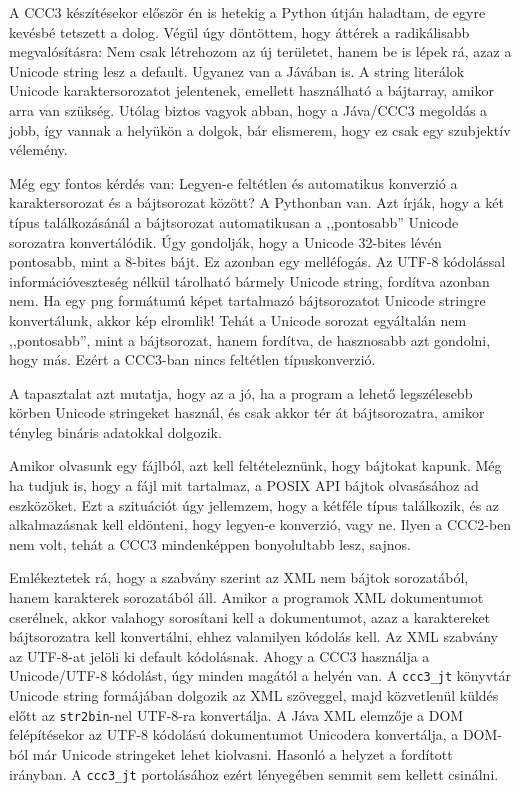A CCC3 készítésekor először én is hetekig a Python útján haladtam,
de egyre kevésbé tetszett a dolog. Végül úgy döntöttem,
hogy áttérek a radikálisabb megvalósításra: Nem csak létrehozom
az új területet, hanem be is lépek rá, azaz a Unicode string
lesz a default. Ugyanez van a Jávában is. A string literálok
Unicode karaktersorozatot jelentenek, emellett használható a
bájtarray, amikor arra van szükség. Utólag biztos vagyok
abban, hogy a Jáva/CCC3 megoldás a jobb, így vannak a helyükön
a dolgok, bár elismerem, hogy ez csak egy szubjektív vélemény.

Még egy fontos kérdés van: Legyen-e feltétlen és automatikus
konverzió a karaktersorozat és a bájtsorozat között?
A Pythonban van. Azt írják, hogy a két típus találkozásánál
a bájtsorozat automatikusan a ,,pontosabb'' Unicode sorozatra
konvertálódik. Úgy gondolják, hogy a Unicode 32-bites lévén
pontosabb, mint a 8-bites bájt. Ez azonban egy melléfogás.
Az UTF-8 kódolással információveszteség nélkül tárolható
bármely Unicode string, fordítva azonban nem.
Ha egy png formátumú képet tartalmazó bájtsorozatot
Unicode stringre konvertálunk, akkor kép elromlik!
Tehát a Unicode sorozat egyáltalán nem ,,pontosabb'', 
mint a bájtsorozat, hanem fordítva, de hasznosabb azt gondolni, 
hogy más. Ezért a CCC3-ban nincs feltétlen típuskonverzió.

A tapasztalat azt mutatja, hogy az a jó, ha a program 
a lehető legszélesebb körben Unicode stringeket használ,
és csak akkor tér át bájtsorozatra, amikor tényleg
bináris adatokkal dolgozik. 

Amikor olvasunk egy fájlból, azt kell feltételeznünk, hogy
bájtokat kapunk. Még ha tudjuk is, hogy a fájl mit tartalmaz,
a POSIX API bájtok olvasásához ad eszközöket. 
Ezt a szituációt úgy jellemzem, hogy a kétféle típus találkozik,
és az alkalmazásnak kell eldönteni, hogy legyen-e konverzió,
vagy ne. Ilyen a CCC2-ben nem volt, tehát a CCC3 mindenképpen
bonyolultabb lesz, sajnos.

Emlékeztetek rá, hogy a szabvány szerint az XML nem bájtok
sorozatából, hanem karakterek sorozatából áll. Amikor a programok
XML dokumentumot cserélnek, akkor valahogy sorosítani kell
a dokumentumot, azaz a karaktereket bájtsorozatra kell
konvertálni, ehhez valamilyen kódolás kell. Az XML szabvány 
az UTF-8-at jelöli ki default kódolásnak. Ahogy a CCC3 használja 
a Unicode/UTF-8 kódolást, úgy minden magától a helyén van. 
A \verb!ccc3_jt! könyvtár Unicode string formájában dolgozik az XML 
szöveggel, majd közvetlenül küldés előtt az \verb!str2bin!-nel 
UTF-8-ra konvertálja. A Jáva XML elemzője a DOM felépítésekor
az UTF-8 kódolású dokumentumot Unicodera konvertálja, 
a DOM-ból már Unicode stringeket lehet kiolvasni.
Hasonló a helyzet a fordított irányban.
A \verb!ccc3_jt! portolásához ezért lényegében semmit sem 
kellett csinálni.

